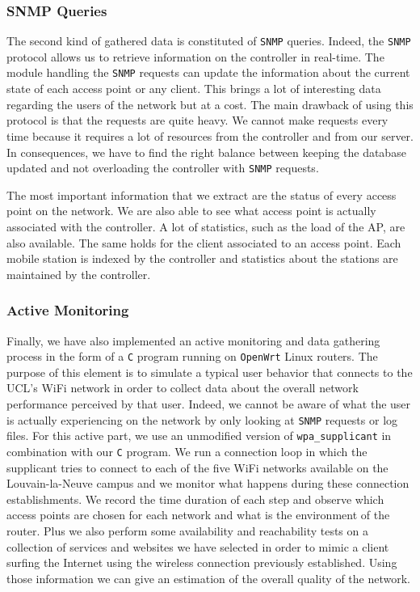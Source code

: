 \subsubsection{SNMP Queries}

The second kind of gathered data is constituted of \texttt{SNMP} queries. Indeed, the \texttt{SNMP} protocol allows us to retrieve information on the controller in real-time. The module handling the \texttt{SNMP} requests can update the information about the current state of each access point or any client. This brings a lot of interesting data regarding the users of the network but at a cost. The main drawback of using this protocol is that the requests are quite heavy. We cannot make requests every time because it requires a lot of resources from the controller and from our server. In consequences, we have to find the right balance between keeping the database updated and not overloading the controller with \texttt{SNMP} requests. 

The most important information that we extract are the status of every access point on the network. We are also able to see what access point is actually associated with the controller. A lot of statistics, such as the load of the AP, are also available. The same holds for the client associated to an access point. Each mobile station is indexed by the controller and statistics about the stations are maintained by the controller.


\subsubsection{Active Monitoring}
Finally, we have also implemented an active monitoring and data gathering process in the form of a \texttt{C} program running on \texttt{OpenWrt} Linux \cite{openwrt} routers. The purpose of this element is to simulate a typical user behavior that connects to the UCL's WiFi network in order to collect data about the overall network performance perceived by that user. Indeed, we cannot be aware of what the user is actually experiencing on the network by only looking at \texttt{SNMP} requests or log files. For this active part, we use an unmodified version of \texttt{wpa\_supplicant} in combination with our \texttt{C} program. We run a connection loop in which the supplicant tries to connect to each of the five WiFi networks available on the Louvain-la-Neuve campus and we monitor what happens during these connection establishments. We record the time duration of each step and observe which access points are chosen for each network and what is the environment of the router. Plus we also perform some availability and reachability tests on a collection of services and websites we have selected in order to mimic a client surfing the Internet using the wireless connection previously established. Using those information we can give an estimation of the overall quality of the network.


